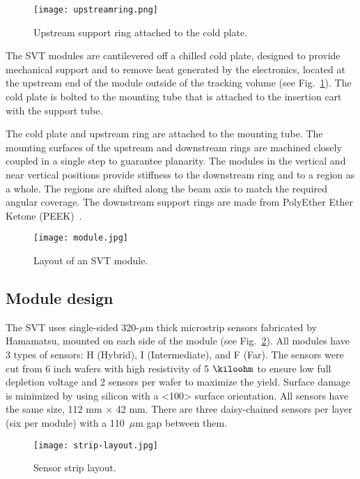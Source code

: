 \begin{figure}[hbt] 
\centering 
\texttt{[image: upstreamring.png]}
\caption{Upstream support ring attached to the cold plate.}
\label{fig:upstreamring}
\end{figure}

 The SVT modules are cantilevered off a chilled cold plate, designed to provide mechanical support and to remove heat generated by the electronics, located at the upstream end of the module outside of the tracking volume (see Fig.~\ref{fig:upstreamring}). The cold plate is bolted to the mounting tube that is attached to the insertion cart with the support tube. 
 
The cold plate and upstream ring are attached to the mounting tube. The mounting surfaces of the upstream and downstream rings are machined closely coupled in a single step to guarantee planarity. The modules in the vertical and near vertical positions provide stiffness to the downstream ring and to a region as a whole. The regions are shifted along the beam axis to match the required angular coverage. The downstream support rings are made from PolyEther Ether Ketone (PEEK)~\cite{NIMVCC}. 

\begin{figure}[hbt] 
\centering 
\texttt{[image: module.jpg]}
\caption{Layout of an SVT module.}
\label{fig:module}
\end{figure}

\subsection{Module design}

The SVT uses single-sided 320-$\mu$m thick microstrip sensors fabricated by Hamamatsu, mounted on each side of the module (see Fig.~\ref{fig:module}). All modules have 3 types of sensors: H (Hybrid), I (Intermediate), and F (Far). The sensors were cut from 6 inch wafers with high resistivity of 5 $\kiloohm$ to ensure low full depletion voltage and 2 sensors per wafer to maximize the yield. Surface damage is minimized by using silicon with a <100> surface orientation. All sensors have the same size, 112 mm $\times$ 42 mm. There are three daisy-chained sensors per layer (six per module) with a 110~$\mu$m gap between them. 

\begin{figure}[hbt] 
\centering 
\texttt{[image: strip-layout.jpg]}
\caption{Sensor strip layout.}
\label{fig:strip-layout}
\end{figure}

